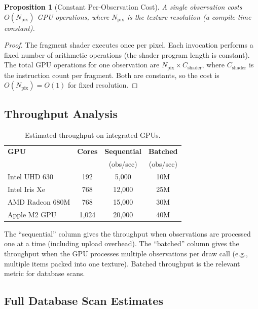 \documentclass[11pt,twocolumn,a4paper]{article}
\newtheorem{proposition}[theorem]{Proposition}
\theoremstyle{definition}
\theoremstyle{remark}
\newcommand{\Npix}{N_{\mathrm{pix}}}
\begin{document}
\begin{proposition}[Constant Per-Observation Cost]
\label{prop:obs_cost}
A single observation costs $O(\Npix)$ GPU operations, where $\Npix$ is the texture resolution (a compile-time constant).
\end{proposition}

\begin{proof}
The fragment shader executes once per pixel. Each invocation performs a fixed number of arithmetic operations (the shader program length is constant). The total GPU operations for one observation are $\Npix \times C_{\mathrm{shader}}$, where $C_{\mathrm{shader}}$ is the instruction count per fragment. Both are constants, so the cost is $O(\Npix) = O(1)$ for fixed resolution.
\end{proof}

\subsection{Throughput Analysis}

\begin{table}[H]
\centering
\caption{Estimated throughput on integrated GPUs.}
\label{tab:throughput}
\begin{tabular}{@{}lccc@{}}
\toprule
\textbf{GPU} & \textbf{Cores} & \textbf{Sequential} & \textbf{Batched} \\
 & & (obs/sec) & (obs/sec) \\
\midrule
Intel UHD 630 & 192 & 5{,}000 & 10M \\
Intel Iris Xe & 768 & 12{,}000 & 25M \\
AMD Radeon 680M & 768 & 15{,}000 & 30M \\
Apple M2 GPU & 1{,}024 & 20{,}000 & 40M \\
\bottomrule
\end{tabular}
\end{table}

The ``sequential'' column gives the throughput when observations are processed one at a time (including upload overhead). The ``batched'' column gives the throughput when the GPU processes multiple observations per draw call (e.g., multiple items packed into one texture). Batched throughput is the relevant metric for database scans.

\subsection{Full Database Scan Estimates}
\end{document}
